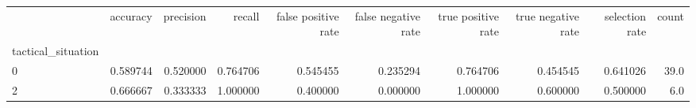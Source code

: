 \begin{tabular}{lrrrrrrrrr}
\toprule
{} &  accuracy &  precision &    recall &  false positive rate &  false negative rate &  true positive rate &  true negative rate &  selection rate &  count \\
tactical\_situation &           &            &           &                      &                      &                     &                     &                 &        \\
\midrule
0                  &  0.589744 &   0.520000 &  0.764706 &             0.545455 &             0.235294 &            0.764706 &            0.454545 &        0.641026 &   39.0 \\
2                  &  0.666667 &   0.333333 &  1.000000 &             0.400000 &             0.000000 &            1.000000 &            0.600000 &        0.500000 &    6.0 \\
\bottomrule
\end{tabular}

